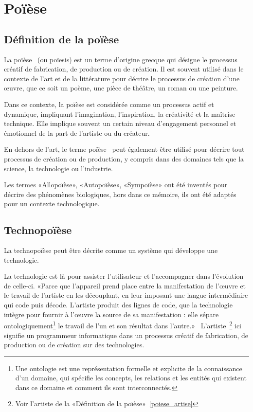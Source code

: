 \section{Poïèse}

\subsection{Définition de la poïèse}

La poïèse~\cite{wiktionary_poiese_2022} (ou poïesis) est un terme d'origine grecque qui désigne le processus créatif de fabrication, de production ou de création. Il est souvent utilisé dans le contexte de l'art et de la littérature pour décrire le processus de création d'une œuvre, que ce soit un poème, une pièce de théâtre, un roman ou une peinture.

Dans ce contexte, la poïèse est considérée comme un processus actif et dynamique, impliquant l'imagination, l'inspiration, la créativité et la maîtrise technique. Elle implique souvent un certain niveau d'engagement personnel et émotionnel de la part de l'artiste\label{poiese_artise} ou du créateur.

En dehors de l'art, le terme poïèse~\cite{wikipedia_poiese_2022} peut également être utilisé pour décrire tout processus de création ou de production, y compris dans des domaines tels que la science, la technologie ou l'industrie.

Les termes «Allopoïèse», «Autopoïèse», «Sympoïèse» ont été inventés pour décrire des phénomènes biologiques, hors dans ce mémoire, ils ont été adaptés pour un contexte technologique.

\subsection{Technopoïèse}



La technopoïèse peut être décrite comme un système qui développe une technologie.

La technologie est là pour assister l'utilisateur et l'accompagner dans l'évolution de celle-ci. «Parce que l’appareil prend place entre la manifestation de l’œuvre et le travail de l’artiste en les découplant, en leur imposant une langue intermédiaire qui code puis décode. L’artiste produit des lignes de code, que la technologie intègre pour fournir à l’œuvre la source de sa manifestation : elle sépare ontologiquement\footnote{Une ontologie est une représentation formelle et explicite de la connaissance d'un domaine, qui spécifie les concepts, les relations et les entités qui existent dans ce domaine et comment ils sont interconnectés.} le travail de l’un et son résultat dans l’autre.»~\cite{artiste_techno_conf_2012} L'artiste~\footnote{Voir l'artiste de la «Définition de la poïèse»~\ref{poiese_artise}} ici signifie un programmeur informatique dans un processus créatif de fabrication, de production ou de création sur des technologies.

